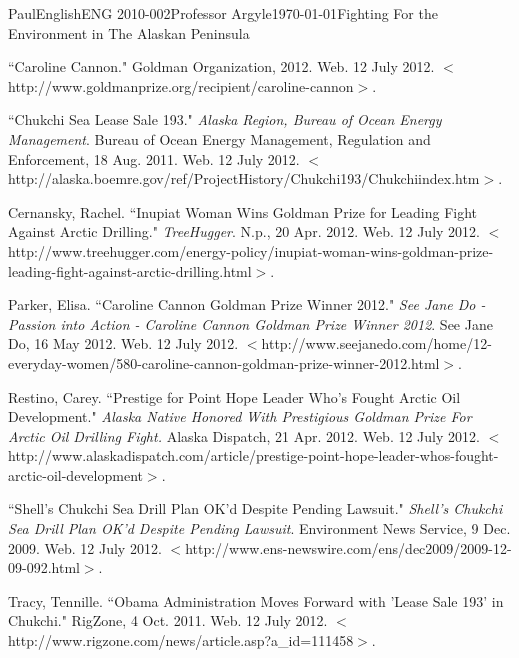 \documentclass[12pt,letterpaper]{article}
\begin{document}
\begin{mla}{Paul}{English}{ENG 2010-002}{Professor Argyle}{\today}{Fighting For the Environment in The Alaskan Peninsula}
\begin{workscited}

\bibent
``Caroline Cannon." Goldman Organization, 2012. Web. 12 July 2012. $<$http://www.goldmanprize.org/recipient/caroline-cannon$>$.

\bibent
``Chukchi Sea Lease Sale 193." \textit{Alaska Region, Bureau of Ocean Energy Management}. Bureau of Ocean Energy Management, Regulation and Enforcement, 18 Aug. 2011. Web. 12 July 2012. $<$http://alaska.boemre.gov/ref/ProjectHistory/Chukchi193/Chukchiindex.htm$>$.

\bibent
Cernansky, Rachel. ``Inupiat Woman Wins Goldman Prize for Leading Fight Against Arctic Drilling." \textit{TreeHugger}. N.p., 20 Apr. 2012. Web. 12 July 2012. $<$http://www.treehugger.com/energy-policy/inupiat-woman-wins-goldman-prize-leading-fight-against-arctic-drilling.html$>$.

\bibent
Parker, Elisa. ``Caroline Cannon Goldman Prize Winner 2012." \textit{See Jane Do - Passion into Action - Caroline Cannon Goldman Prize Winner 2012}. See Jane Do, 16 May 2012. Web. 12 July 2012. $<$http://www.seejanedo.com/home/12-everyday-women/580-caroline-cannon-goldman-prize-winner-2012.html$>$.

\bibent 
Restino, Carey. ``Prestige for Point Hope Leader Who's Fought Arctic Oil Development." \textit{Alaska Native Honored With Prestigious Goldman Prize For Arctic Oil Drilling Fight.} Alaska Dispatch, 21 Apr. 2012. Web. 12 July 2012. $<$http://www.alaskadispatch.com/article/prestige-point-hope-leader-whos-fought-arctic-oil-development$>$.

\bibent
``Shell's Chukchi Sea Drill Plan OK'd Despite Pending Lawsuit." \textit{Shell's Chukchi Sea Drill Plan OK'd Despite Pending Lawsuit}. Environment News Service, 9 Dec. 2009. Web. 12 July 2012. $<$http://www.ens-newswire.com/ens/dec2009/2009-12-09-092.html$>$.

\bibent
Tracy, Tennille. ``Obama Administration Moves Forward with 'Lease Sale 193' in Chukchi." RigZone, 4 Oct. 2011. Web. 12 July 2012. $<$http://www.rigzone.com/news/article.asp?a\_id=111458$>$.

\end{workscited}
\end{mla}
\end{document}
